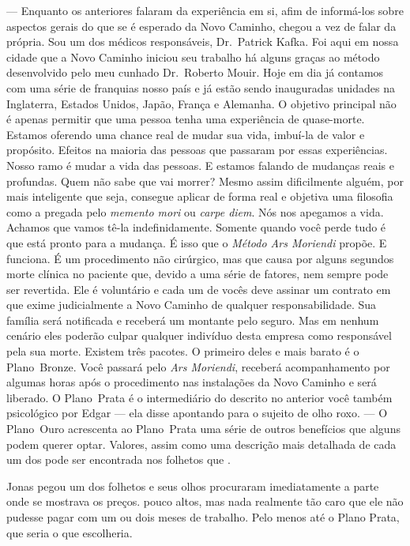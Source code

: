 --- Enquanto os anteriores falaram da experiência em si, afim de informá-los sobre aspectos gerais do que se é esperado da Novo Caminho, chegou a vez de falar da própria. Sou um dos médicos responsáveis, Dr.~Patrick Kafka. Foi aqui\mudanca{,} em nossa cidade\mudanca{,} que a Novo Caminho iniciou seu trabalho há alguns  graças ao método desenvolvido pelo meu cunhado\mudanca{,} Dr.~Roberto Mouir. Hoje em dia\mudanca{,} já contamos com uma série de franquias  nosso país\mudanca{,} e já estão sendo inauguradas unidades na Inglaterra, Estados Unidos, Japão, França e Alemanha. O objetivo principal não é apenas permitir que uma pessoa tenha uma experiência de quase-morte. Estamos oferendo uma chance real de mudar sua vida, imbuí-la de valor e propósito. Efeitos  na maioria das pessoas que passaram por essas experiências. Nosso ramo é  mudar a vida das pessoas. E estamos falando de mudanças reais e profundas. Quem não sabe que vai morrer? Mesmo assim\mudanca{,} dificilmente alguém, por mais inteligente que seja, consegue aplicar de forma real e objetiva uma filosofia como a pregada pelo \emph{memento mori} ou \emph{carpe diem}. Nós nos apegamos a vida. Achamos que vamos tê-la indefinidamente. Somente quando você perde tudo é que está pronto para a mudança. É isso que o \emph{Método Ars Moriendi} propõe. E funciona. É um procedimento não cirúrgico, mas que causa por alguns segundos morte clínica no paciente que, devido a uma série de fatores, nem sempre pode ser revertida. Ele é voluntário e cada um de vocês deve assinar um contrato em que exime judicialmente a Novo Caminho de qualquer responsabilidade. Sua família será notificada e receberá um montante pelo seguro. Mas\mudanca{,} em nenhum cenário\mudanca{,} eles poderão culpar qualquer indivíduo desta empresa como responsável pela sua morte. Existem três pacotes. O primeiro deles e mais barato é o Plano~Bronze. Você passará pelo \emph{Ars Moriendi}, receberá acompanhamento por algumas horas após o procedimento nas instalações da Novo Caminho e será liberado. O Plano~Prata é o intermediário do descrito no anterior\mudanca{,} você também  psicológico por Edgar --- ela disse apontando para o sujeito de olho roxo. --- O Plano~Ouro acrescenta ao Plano~Prata uma série de outros benefícios que alguns podem querer optar. Valores, assim como uma descrição mais detalhada de cada um dos  pode ser encontrada nos folhetos que .

Jonas pegou um dos folhetos e seus olhos procuraram imediatamente a parte onde se mostrava os preços.  pouco altos, mas nada realmente tão caro que ele não pudesse pagar com um ou dois meses de trabalho. Pelo menos até o Plano Prata, que seria o que escolheria.

